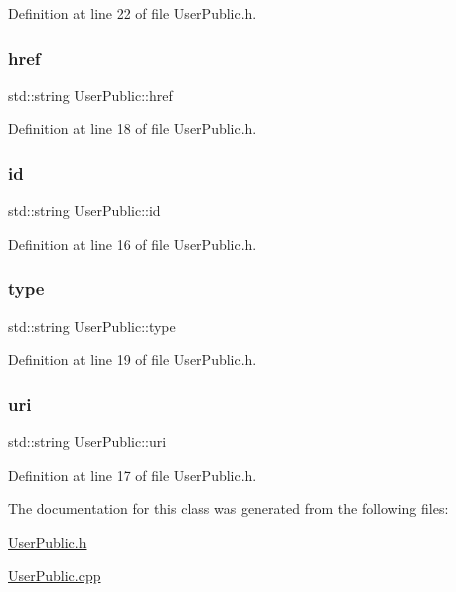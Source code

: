 Definition at line 22 of file User\+Public.\+h.

\mbox{\label{class_user_public_a804638a701afff8a4e2ee7167095d52f}} 
\subsubsection{\texorpdfstring{href}{href}}
{\footnotesize\ttfamily std\+::string User\+Public\+::href\hspace{0.3cm}{\ttfamily [private]}}



Definition at line 18 of file User\+Public.\+h.

\mbox{\label{class_user_public_ad16ed154d238827cd19a25fdffa662f7}} 
\subsubsection{\texorpdfstring{id}{id}}
{\footnotesize\ttfamily std\+::string User\+Public\+::id\hspace{0.3cm}{\ttfamily [private]}}



Definition at line 16 of file User\+Public.\+h.

\mbox{\label{class_user_public_aefc81debb992d7c4123d4bb6633b82f8}} 
\subsubsection{\texorpdfstring{type}{type}}
{\footnotesize\ttfamily std\+::string User\+Public\+::type\hspace{0.3cm}{\ttfamily [private]}}



Definition at line 19 of file User\+Public.\+h.

\mbox{\label{class_user_public_ad06637401887e91a8c6c1a9ed9f582a0}} 
\subsubsection{\texorpdfstring{uri}{uri}}
{\footnotesize\ttfamily std\+::string User\+Public\+::uri\hspace{0.3cm}{\ttfamily [private]}}



Definition at line 17 of file User\+Public.\+h.



The documentation for this class was generated from the following files\+:\begin{DoxyCompactItemize}
\item 
\mbox{\hyperlink{_user_public_8h}{User\+Public.\+h}}\item 
\mbox{\hyperlink{_user_public_8cpp}{User\+Public.\+cpp}}\end{DoxyCompactItemize}

